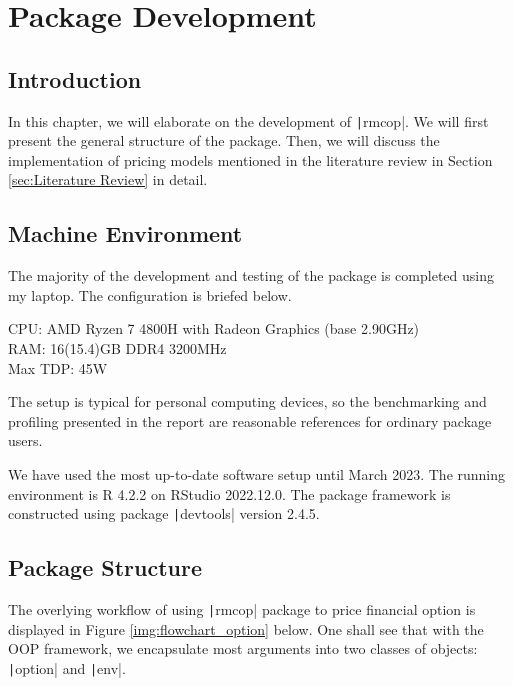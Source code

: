 \chapter{Package Development} \label{cpt:Pkg Dev}

\section{Introduction}

In this chapter, we will elaborate on the development of \texttt|rmcop|. We will first present the general structure of the package. Then, we will discuss the implementation of pricing models mentioned in the literature review in Section \ref{sec:Literature Review} in detail.

\section{Machine Environment} \label{sec:machine_env}

The majority of the development and testing of the package is completed using my laptop. The configuration is briefed below.

\begin{listing}[H]
CPU: AMD Ryzen 7 4800H with Radeon Graphics (base 2.90GHz) \\
RAM: 16(15.4)GB DDR4 3200MHz \\
Max TDP: 45W
\end{listing}

The setup is typical for personal computing devices, so the benchmarking and profiling presented in the report are reasonable references for ordinary package users.

We have used the most up-to-date software setup until March 2023. The running environment is R 4.2.2 on RStudio 2022.12.0. The package framework is constructed using package \texttt|devtools| version 2.4.5.

\section{Package Structure} \label{sec:Pkg Structure}

The overlying workflow of using \texttt|rmcop| package to price financial option is displayed in Figure \ref{img:flowchart_option} below. One shall see that with the OOP framework, we encapsulate most arguments into two classes of objects: \texttt|option| and \texttt|env|.

